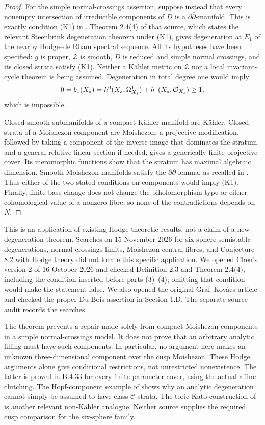 \begin{proof}
For the simple normal-crossings assertion, suppose instead that
every nonempty intersection of irreducible components of $D$
is a $\partial\bar\partial$-manifold. This is exactly condition
(K1) in \citet[Definition 2.3]{Chen2026HodgeRoot}.
Theorem 2.4(4) of that source, which states the relevant
Steenbrink degeneration theorem under (K1), gives degeneration
at $E_1$ of the nearby Hodge--de Rham spectral sequence.
All its hypotheses have been specified: $g$ is proper,
$\mathcal Z$ is smooth, $D$ is reduced and simple normal
crossings, and its closed strata satisfy (K1). Neither a
K\"ahler metric on $\mathcal Z$ nor a local invariant-cycle
theorem is being assumed. Degeneration in total degree one
would imply
\[
 0=b_1(X_s)=h^0(X_s,\Omega^1_{X_s})+h^1(X_s,\mathcal O_{X_s})
          \geq1,
\]
which is impossible.

Closed smooth submanifolds of a compact K\"ahler manifold are
K\"ahler. Closed strata of a Moishezon component are Moishezon:
a projective modification, followed by taking a component of
the inverse image that dominates the stratum and a general
relative linear section if needed, gives a generically finite
projective cover. Its meromorphic functions show that the
stratum has maximal algebraic dimension. Smooth Moishezon
manifolds satisfy the $\partial\bar\partial$-lemma, as recalled
in \citet[Section 2.1, p.8]{Chen2026HodgeRoot}. Thus either
of the two stated conditions on components would imply (K1).
Finally, finite base change does not change the biholomorphism
type or either cohomological value of a nonzero fibre, so none
of the contradictions depends on $N$.
\end{proof}

This is an application of existing Hodge-theoretic results, not
a claim of a new degeneration theorem. Searches on 15 November
2026 for six-sphere semistable degenerations, normal-crossings
limits, Moishezon central fibres, and Conjecture 8.2 with Hodge
theory did not locate this specific application. We opened
Chen's version 2 of 16 October 2026 and checked Definition 2.3
and Theorem 2.4(4), including the condition inserted before
parts (3)--(4); omitting that condition would make the
statement false. We also opened the original Graf--Kov\'acs
article and checked the proper Du Bois assertion in Section
1.D. The separate source audit records the searches.

The theorem prevents a repair made solely from compact
Moishezon components in a simple normal-crossings model.
It does not prove that an arbitrary analytic filling must have
such components. In particular, no argument here makes an
unknown three-dimensional component over the cusp Moishezon.
These Hodge arguments alone give conditional restrictions, not
unrestricted nonexistence. The latter is proved in B.4.33 for
every finite parameter cover, using the actual affine clutching.
The Hopf-component example of
\citet[Theorem 1.4 and Example 2.1]{Nishiguchi1988IIRoot}
shows why an analytic degeneration cannot simply be assumed to
have class-$\mathcal C$ strata. The toric-Kato construction of
\citet[Theorem 7.1]{IstratiEtAl2022Root} is another relevant
non-K\"ahler analogue. Neither source supplies the required
cusp comparison for the six-sphere family.






